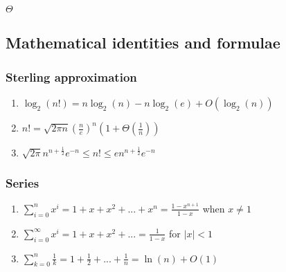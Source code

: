 \documentclass[a4paper]{article}
\begin{document}
\(\Theta\)

\subsection{Mathematical identities and formulae}
\subsubsection{Sterling approximation}
\begin{enumerate}
	\item $\log_2 (n!) = n\log_2 (n) - n\log_2 (e) + O(\log_2 (n))$
	\item $n! = \sqrt{2\pi n} (\frac{n}{e})^{n}(1 + \Theta(\frac{1}{n}))$
	\item $\sqrt{2\pi}n^{n+\frac{1}{2}}e^{-n} \le n! \le en^{n+\frac{1}{2}}e^{-n}$
\end{enumerate}
\subsubsection{Series}
\begin{enumerate}
	\item $\sum_{i=0}^{n}x^{i} = 1 + x + x^{2} +... + x^{n} = \frac{1-x^{n+1}}{1-x}$ when $x\neq1$
	\item $\sum_{i=0}^{\infty}x^{i} = 1 + x + x^{2} +... = \frac{1}{1-x}$ for $|x|<1$
	\item $\sum_{k=0}^{n}\frac{1}{k} = 1 + \frac{1}{2} +... +\frac{1}{n} = \ln(n) + O(1)$
\end{enumerate}
\end{document}

